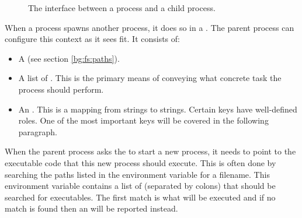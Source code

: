 \begin{figure}[tbp]
  
  \caption{The interface between a process and a child process.}
  \label{fig:bg:processes:communication}
\end{figure}

When a process spawns another process, it does so in a . The parent process can configure this context as it sees fit. It consists of:
\begin{itemize}
  \item A  (see section \ref{bg:fs:paths}).
  \item A list of . This is the primary means of conveying what concrete task the  process should perform.
  \item An . This is a mapping from strings to strings. Certain keys have well-defined roles. One of the most important keys will be covered in the following paragraph.
\end{itemize}

When the parent process asks the  to start a new process, it needs to point to the executable code that this new process should execute. This is often done by searching the paths listed in the  environment variable for a filename. This environment variable contains a list of  (separated by colons) that should be searched for executables. The first match is what will be executed and if no match is found then an  will be reported instead.

